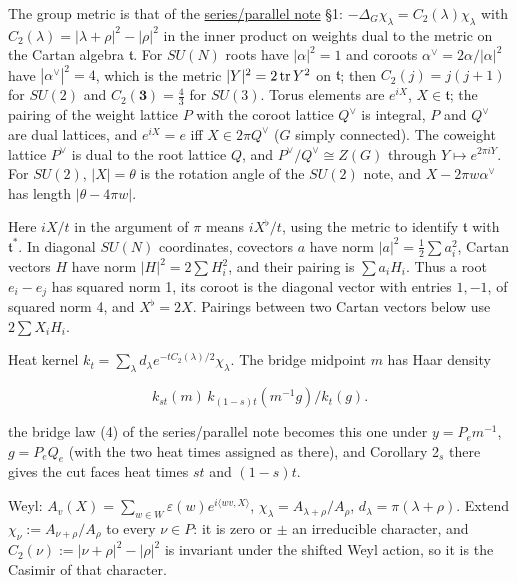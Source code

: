 \documentclass[11pt,a4paper]{article}
\begin{document}
The group metric is that of the
\href{series-parallel-gauge-refinement.md}{series/parallel note} §1:
\(-\Delta_G\chi_\lambda=C_2(\lambda)\chi_\lambda\) with
\(C_2(\lambda)=|\lambda+\rho|^2-|\rho|^2\) in the inner product on
weights dual to the metric on the Cartan algebra \(\mathfrak t\). For
\(SU(N)\) roots have \(|\alpha|^2=1\) and coroots
\(\alpha^\vee=2\alpha/|\alpha|^2\) have \(|\alpha^\vee|^2=4\), which is
the metric \(|Y|^2=2\,{\rm tr}\,Y^2\) on \(\mathfrak t\); then
\(C_2(j)=j(j+1)\) for \(SU(2)\) and \(C_2(\mathbf 3)=\frac43\) for
\(SU(3)\). Torus elements are \(e^{iX}\), \(X\in\mathfrak t\); the
pairing of the weight lattice \(P\) with the coroot lattice \(Q^\vee\)
is integral, \(P\) and \(Q^\vee\) are dual lattices, and \(e^{iX}=e\)
iff \(X\in2\pi Q^\vee\) (\(G\) simply connected). The coweight lattice
\(P^\vee\) is dual to the root lattice \(Q\), and
\(P^\vee/Q^\vee\cong Z(G)\) through \(Y\mapsto e^{2\pi iY}\). For
\(SU(2)\), \(|X|=\theta\) is the rotation angle of the \(SU(2)\) note,
and \(X-2\pi w\alpha^\vee\) has length \(|\theta-4\pi w|\).

Here \(iX/t\) in the argument of \(\pi\) means \(iX^\flat/t\), using the
metric to identify \(\mathfrak t\) with \(\mathfrak t^*\). In diagonal
\(SU(N)\) coordinates, covectors \(a\) have norm
\(|a|^2=\frac12\sum a_i^2\), Cartan vectors \(H\) have norm
\(|H|^2=2\sum H_i^2\), and their pairing is \(\sum a_iH_i\). Thus a root
\(e_i-e_j\) has squared norm 1, its coroot is the diagonal vector with
entries \(1,-1\), of squared norm 4, and \(X^\flat=2X\). Pairings
between two Cartan vectors below use \(2\sum X_iH_i\).

Heat kernel
\(k_t=\sum_\lambda d_\lambda e^{-tC_2(\lambda)/2}\chi_\lambda\). The
bridge midpoint \(m\) has Haar density

\[k_{st}(m)\,k_{(1-s)t}(m^{-1}g)/k_t(g).\]

the bridge law (4) of the series/parallel note becomes this one under
\(y=P_em^{-1}\), \(g=P_eQ_e\) (with the two heat times assigned as
there), and Corollary 2\(_s\) there gives the cut faces heat times
\(st\) and \((1-s)t\).

Weyl: \(A_v(X)=\sum_{w\in W}\varepsilon(w)e^{i\langle wv,X\rangle}\),
\(\chi_\lambda=A_{\lambda+\rho}/A_\rho\),
\(d_\lambda=\pi(\lambda+\rho)\). Extend
\(\chi_\nu:=A_{\nu+\rho}/A_\rho\) to every \(\nu\in P\): it is zero or
\(\pm\) an irreducible character, and
\(C_2(\nu):=|\nu+\rho|^2-|\rho|^2\) is invariant under the shifted Weyl
action, so it is the Casimir of that character.
\end{document}
